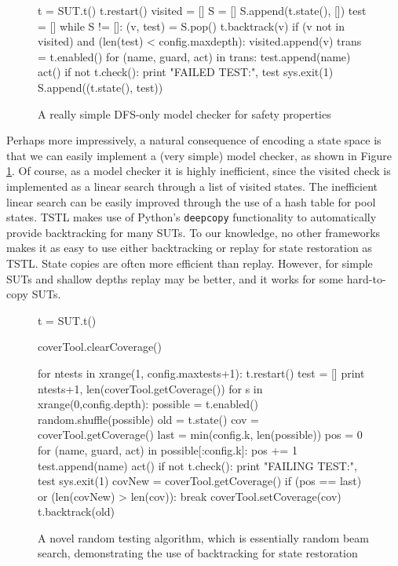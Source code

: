 \documentclass[runningheads,a4paper]{llncs}
\begin{document}
\begin{figure}
{\scriptsize
\begin{code}
t = SUT.t()
t.restart()
visited = []
S = []
S.append(t.state(), [])
test = []
while S != []:
    (v, test) = S.pop()
    t.backtrack(v)
    if (v not in visited) and (len(test) < config.maxdepth):
        visited.append(v)
        trans = t.enabled()
        for (name, guard, act) in trans:
            test.append(name)
            act()
            if not t.check():
                print "FAILED TEST:", test
                sys.exit(1)
            S.append((t.state(), test))
\end{code}
}
\caption{A really simple DFS-only model checker for safety properties}
\label{fig:modcheck}
\vspace{-0.25in}
\end{figure}

Perhaps more impressively, a natural consequence of encoding a state
space is that we can easily implement a (very simple) model checker,
as shown in Figure \ref{fig:modcheck}.  Of course, as a model checker
it is highly inefficient, since the visited check is implemented as a
linear search through a list of visited states.  The inefficient
linear search can be easily improved through the use of a hash table
for pool states.  TSTL makes use of Python's {\tt deepcopy}
functionality to automatically provide backtracking for many SUTs.  To
our knowledge, no other frameworks makes it as easy to use either
backtracking or replay for state restoration as TSTL. State copies are
often more efficient than replay.  However, for simple SUTs and
shallow depths replay may be better, and it works for some hard-to-copy
SUTs.

\begin{figure}
{\scriptsize
\begin{code}
t = SUT.t()

coverTool.clearCoverage()

for ntests in xrange(1, config.maxtests+1):
    t.restart()
    test = []
    print ntests+1, len(coverTool.getCoverage())
    for s in xrange(0,config.depth):
        possible = t.enabled()
        random.shuffle(possible)
        old = t.state()
        cov = coverTool.getCoverage()
	last = min(config.k, len(possible))
	pos = 0
        for (name, guard, act) in possible[:config.k]:
	    pos += 1
            test.append(name)
            act()
            if not t.check():
                print "FAILING TEST:", test
                sys.exit(1)
            covNew = coverTool.getCoverage()
            if (pos == last) or (len(covNew) > len(cov)):
                break
            coverTool.setCoverage(cov)
            t.backtrack(old)
\end{code}
}
\caption{A novel random testing algorithm, which is essentially random beam search, demonstrating the use of backtracking for state restoration}
\label{fig:novelrt}
\end{figure}
\end{document}
